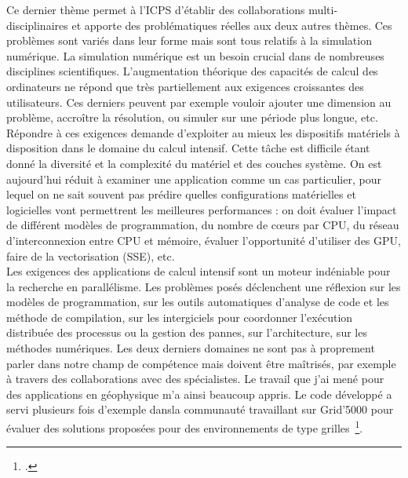 \documentclass[11pt]{article}
\begin{document}
Ce dernier thème permet à l'ICPS d'établir des collaborations multi-%
disciplinaires et apporte des problématiques réelles aux deux autres 
thèmes. Ces problèmes sont variés dans leur forme mais sont tous
relatifs à la simulation numérique.
La simulation numérique est un besoin crucial dans de nombreuses 
disciplines scientifiques. L'augmentation théorique des capacités
de calcul des ordinateurs ne répond que très partiellement aux
exigences croissantes des utilisateurs. Ces derniers peuvent par
exemple vouloir ajouter une dimension au problème, accroître la 
résolution, ou simuler sur une période plus longue, etc. Répondre 
à ces exigences demande d'exploiter au mieux les dispositifs 
matériels à disposition dans le domaine du calcul intensif.
Cette tâche est difficile étant donné la diversité et la complexité
du matériel et des couches système. On est aujourd'hui réduit à examiner 
une application comme un cas particulier, pour lequel on ne sait souvent
pas prédire quelles configurations matérielles et logicielles vont 
permettrent les meilleures performances : on doit évaluer l'impact de
différent modèles de programmation, du nombre de c{\oe}urs par CPU,
du réseau d'interconnexion entre CPU et mémoire, évaluer l'opportunité
d'utiliser des GPU, faire de la vectorisation (SSE), etc.\\

Les exigences des applications de calcul intensif sont un moteur indéniable
pour la recherche en parallélisme. Les problèmes posés déclenchent une 
réflexion sur les modèles de programmation, sur les outils automatiques
d'analyse de code et les méthode de compilation, sur les intergiciels 
pour coordonner l'exécution distribuée des processus ou la gestion des pannes, 
sur l'architecture, sur les méthodes numériques. Les deux derniers domaines ne
 sont pas à proprement parler dans notre champ de compétence mais doivent
être maîtrisés, par exemple à travers des collaborations avec des 
spécialistes. Le travail que j'ai mené pour des applications en géophysique 
m'a ainsi beaucoup appris. Le code développé a servi plusieurs fois d'exemple 
dansla communauté travaillant sur Grid'5000 pour évaluer des solutions proposées
pour des environnements de type grilles~\footcite{Cappello07}.  \\
\end{document}
